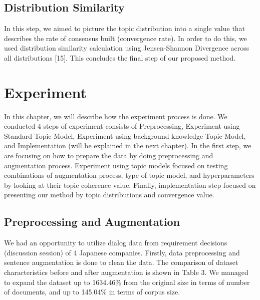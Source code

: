 \documentclass[senior]{IPSstyle}
\begin{document}
\section{Distribution Similarity}

In this step, we aimed to picture the topic distribution into a single value that describes the rate of consensus built (convergence rate). In order to do this, we used distribution similarity calculation using Jensen-Shannon Divergence across all distributions [15]. This concludes the final step of our proposed method.

\chapter{Experiment} 

In this chapter, we will describe how the experiment process is done. We conducted 4 steps of experiment consists of Preprocessing, Experiment using Standard Topic Model, Experiment using background knowledge Topic Model, and Implementation (will be explained in the next chapter). In the first step, we are focusing on how to prepare the data by doing preprocessing and augmentation process. Experiment using topic models focused on testing combinations of augmentation process, type of topic model, and hyperparameters by looking at their topic coherence value. Finally, implementation step focused on presenting our method by topic distributions and convergence value.

\section{Preprocessing and Augmentation}

We had an opportunity to utilize dialog data from requirement decisions (discussion session) of 4 Japanese companies. Firstly, data preprocessing and sentence augmentation is done to clean the data. The comparison of dataset characteristics before and after augmentation is shown in Table 3. We managed to expand the dataset up to 1634.46\% from the original size in terms of number of documents, and up to 145.04\% in terms of corpus size.
\end{document}
